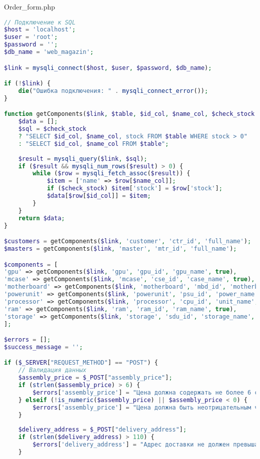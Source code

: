 

Order\_form.php
\begin{lstlisting}[language=Php, frame=none]
// Подключение к SQL
$host = 'localhost';
$user = 'root';
$password = '';
$db_name = 'web_magazin';

$link = mysqli_connect($host, $user, $password, $db_name);

if (!$link) {
	die("Ошибка подключения: " . mysqli_connect_error());
}

function getComponents($link, $table, $id_col, $name_col, $check_stock = false) {
	$data = [];
	$sql = $check_stock 
	? "SELECT $id_col, $name_col, stock FROM $table WHERE stock > 0"
	: "SELECT $id_col, $name_col FROM $table";
	
	$result = mysqli_query($link, $sql);
	if ($result && mysqli_num_rows($result) > 0) {
		while ($row = mysqli_fetch_assoc($result)) {
			$item = ['name' => $row[$name_col]];
			if ($check_stock) $item['stock'] = $row['stock'];
			$data[$row[$id_col]] = $item;
		}
	}
	return $data;
}

$customers = getComponents($link, 'customer', 'ctr_id', 'full_name');
$masters = getComponents($link, 'master', 'mtr_id', 'full_name');

$components = [
'gpu' => getComponents($link, 'gpu', 'gpu_id', 'gpu_name', true),
'mcase' => getComponents($link, 'mcase', 'cse_id', 'case_name', true),
'motherboard' => getComponents($link, 'motherboard', 'mbd_id', 'motherboard_name', true),
'powerunit' => getComponents($link, 'powerunit', 'psu_id', 'power_name', true),
'processor' => getComponents($link, 'processor', 'cpu_id', 'unit_name', true),
'ram' => getComponents($link, 'ram', 'ram_id', 'ram_name', true),
'storage' => getComponents($link, 'storage', 'sdu_id', 'storage_name', true)
];

$errors = [];
$success_message = '';

if ($_SERVER["REQUEST_METHOD"] == "POST") {
	// Валидация данных
	$assembly_price = $_POST["assembly_price"];
	if (strlen($assembly_price) > 6) {
		$errors['assembly_price'] = "Цена должна содержать не более 6 символов.";
	} elseif (!is_numeric($assembly_price) || $assembly_price < 0) {
		$errors['assembly_price'] = "Цена должна быть неотрицательным числом.";
	}
	
	$delivery_address = $_POST["delivery_address"];
	if (strlen($delivery_address) > 110) {
		$errors['delivery_address'] = "Адрес доставки не должен превышать 110 символов.";
	}
	

\end{lstlisting}
